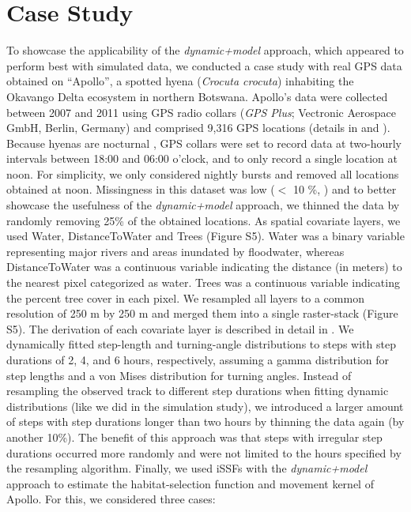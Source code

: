 \documentclass[abstract=on,10pt,a4paper,bibliography=totocnumbered]{article}
\begin{document}
\section{Case Study}

To showcase the applicability of the \textit{dynamic+model} approach, which
appeared to perform best with simulated data, we conducted a case study with
real GPS data obtained on ``Apollo'', a spotted hyena (\textit{Crocuta crocuta})
inhabiting the Okavango Delta ecosystem in northern Botswana. Apollo's data were
collected between 2007 and 2011 using GPS radio collars (\textit{GPS Plus};
Vectronic Aerospace GmbH, Berlin, Germany) and comprised 9,316 GPS locations
(details in \citealp{Cozzi.2013a} and \citealp{Cozzi.2015}). Because hyenas are
nocturnal \citep{Cozzi.2012}, GPS collars were set to record data at two-hourly
intervals between 18:00 and 06:00 o'clock, and to only record a single location
at noon. For simplicity, we only considered nightly bursts and removed all
locations obtained at noon. Missingness in this dataset was low ($<$ 10 \%,
\citealp{Cozzi.2015}) and to better showcase the usefulness of the
\textit{dynamic+model} approach, we thinned the data by randomly removing 25\%
of the obtained locations. As spatial covariate layers, we used \textsf{Water},
\textsf{DistanceToWater} and \textsf{Trees} (Figure S5). \textsf{Water} was a
binary variable representing major rivers and areas inundated by floodwater,
whereas \textsf{DistanceToWater} was a continuous variable indicating the
distance (in meters) to the nearest pixel categorized as water. \textsf{Trees}
was a continuous variable indicating the percent tree cover in each pixel. We
resampled all layers to a common resolution of 250 m by 250 m and merged them
into a single raster-stack (Figure S5). The derivation of each covariate layer
is described in detail in \citealp{Hofmann.2021}. We dynamically fitted
step-length and turning-angle distributions to steps with step durations of 2,
4, and 6 hours, respectively, assuming a gamma distribution for step lengths and
a von Mises distribution for turning angles. Instead of resampling the observed
track to different step durations when fitting dynamic distributions (like we
did in the simulation study), we introduced a larger amount of steps with step
durations longer than two hours by thinning the data again (by another 10\%).
The benefit of this approach was that steps with irregular step durations
occurred more randomly and were not limited to the hours specified by the
resampling algorithm. Finally, we used iSSFs with the \textit{dynamic+model}
approach to estimate the habitat-selection function and movement kernel of
Apollo. For this, we considered three cases:
\end{document}
